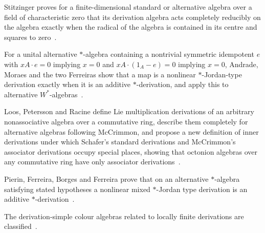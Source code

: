 Stitzinger proves for a finite-dimensional standard or alternative algebra over a field of characteristic zero that its derivation algebra acts completely reducibly on the algebra exactly when the radical of the algebra is contained in its centre and squares to zero~\cite{WlStandardAndAlternativeAlgebras1974}.

For a unital alternative $*$-algebra containing a nontrivial symmetric idempotent $e$ with $xA\cdot e=0$ implying $x=0$ and $xA\cdot(1_A-e)=0$ implying $x=0$, Andrade, Moraes and the two Ferreiras show that a map is a nonlinear $*$-Jordan-type derivation exactly when it is an additive $*$-derivation, and apply this to alternative $W^*$-algebras~\cite{WlNonlinearStarJordanTypeDerivat2022}.

Loos, Petersson and Racine define Lie multiplication derivations of an arbitrary nonassociative algebra over a commutative ring, describe them completely for alternative algebras following McCrimmon, and propose a new definition of inner derivations under which Schafer's standard derivations and McCrimmon's associator derivations occupy special places, showing that octonion algebras over any commutative ring have only associator derivations~\cite{WlInnerDerivationsOfAlternativeA2008}.

Pierin, Ferreira, Borges and Ferreira prove that on an alternative $*$-algebra satisfying stated hypotheses a nonlinear mixed $*$-Jordan type derivation is an additive $*$-derivation~\cite{WlAboutTheAdditivityOfANonlinear2020}.

The derivation-simple colour algebras related to locally finite derivations are classified~\cite{WlClassificationOfDerivationSimp2020}.

